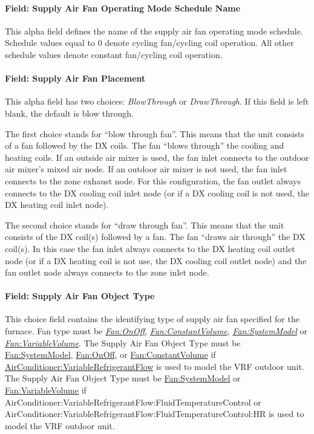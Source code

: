 \paragraph{Field: Supply Air Fan Operating Mode Schedule Name}\label{field-supply-air-fan-operating-mode-schedule-name-7}

This alpha field defines the name of the supply air fan operating mode schedule. Schedule values equal to 0 denote cycling fan/cycling coil operation. All other schedule values denote constant fan/cycling coil operation.

\paragraph{Field: Supply Air Fan Placement}\label{field-supply-air-fan-placement-000}

This alpha field has two choices: \textit{BlowThrough} or \textit{DrawThrough}. If this field is left blank, the default is blow through.

The first choice stands for ``blow through fan''. This means that the unit consists of a fan followed by the DX coils. The fan ``blows through'' the cooling and heating coils. If an outside air mixer is used, the fan inlet connects to the outdoor air mixer's mixed air node. If an outdoor air mixer is not used, the fan inlet connects to the zone exhaust node. For this configuration, the fan outlet always connects to the DX cooling coil inlet node (or if a DX cooling coil is not used, the DX heating coil inlet node).

The second choice stands for ``draw through fan''. This means that the unit consists of the DX coil(s) followed by a fan. The fan ``draws air through'' the DX coil(s). In this case the fan inlet always connects to the DX heating coil outlet node (or if a DX heating coil is not use, the DX cooling coil outlet node) and the fan outlet node always connects to the zone inlet node.

\paragraph{Field: Supply Air Fan Object Type}\label{field-supply-air-fan-object-type-8}

This choice field contains the identifying type of supply air fan specified for the furnace. Fan type must be \textit{\hyperref[fanonoff]{Fan:OnOff}}, \textit{\hyperref[fanconstantvolume]{Fan:ConstantVolume}}, \textit{\hyperref[fansystemmodel]{Fan:SystemModel}} or \textit{\hyperref[fanvariablevolume]{Fan:VariableVolume}}. The Supply Air Fan Object Type must be \hyperref[fansystemmodel]{Fan:SystemModel}, \hyperref[fanonoff]{Fan:OnOff}, or \hyperref[fanconstantvolume]{Fan:ConstantVolume} if \hyperref[airconditionervariablerefrigerantflow]{AirConditioner:VariableRefrigerantFlow} is used to model the VRF outdoor unit. The Supply Air Fan Object Type must be \hyperref[fansystemmodel]{Fan:SystemModel} or \hyperref[fanvariablevolume]{Fan:VariableVolume} if AirConditioner:VariableRefrigerantFlow:\-FluidTemperatureControl or AirConditioner:VariableRefrigerantFlow:\-FluidTemperatureControl:HR is used to model the VRF outdoor unit.

